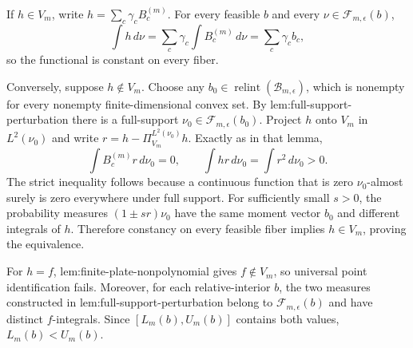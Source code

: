 If \(h\in V_m\), write \(h=\sum_c\gamma_cB_c^{(m)}\).  For every feasible \(b\) and every \(\nu\in\mathcal F_{m,\epsilon}(b)\),
\[
 \int h\,d\nu=\sum_c\gamma_c\int B_c^{(m)}\,d\nu
 =\sum_c\gamma_cb_c,
\]
so the functional is constant on every fiber.

Conversely, suppose \(h\notin V_m\).  Choose any \(b_0\in\operatorname{relint}(\mathcal B_{m,\epsilon})\), which is nonempty for every nonempty finite-dimensional convex set.  By lem:full-support-perturbation there is a full-support \(\nu_0\in\mathcal F_{m,\epsilon}(b_0)\).  Project \(h\) onto \(V_m\) in \(L^2(\nu_0)\) and write \(r=h-\Pi_{V_m}^{L^2(\nu_0)}h\).  Exactly as in that lemma,
\[
 \int B_c^{(m)}r\,d\nu_0=0,
 \qquad
 \int hr\,d\nu_0=\int r^2\,d\nu_0>0.
\]
The strict inequality follows because a continuous function that is zero \(\nu_0\)-almost surely is zero everywhere under full support.  For sufficiently small \(s>0\), the probability measures \((1\pm sr)\nu_0\) have the same moment vector \(b_0\) and different integrals of \(h\).  Therefore constancy on every feasible fiber implies \(h\in V_m\), proving the equivalence.

For \(h=f\), lem:finite-plate-nonpolynomial gives \(f\notin V_m\), so universal point identification fails.  Moreover, for each relative-interior \(b\), the two measures constructed in lem:full-support-perturbation belong to \(\mathcal F_{m,\epsilon}(b)\) and have distinct \(f\)-integrals.  Since \([L_m(b),U_m(b)]\) contains both values, \(L_m(b)<U_m(b)\).